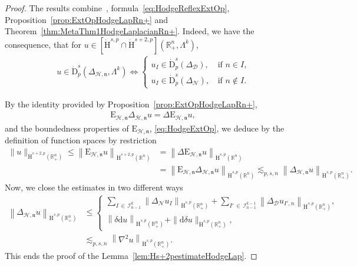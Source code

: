 \documentclass[AHL,Unicode,longabstracts,published]{cedram}
\newcommand{\bbR}{\mathbb{R}}
\newcommand{\rmH}{\mathrm{H}}%
\newcommand{\rmd}{\mathrm{d}}
\newcommand{\rmD}{\mathrm{D}}
\newcommand{\rmE}{\mathrm{E}}
\newcommand{\clH}{\mathcal{H}}
\newcommand{\clI}{\mathcal{I}}
\newcommand{\clN}{\mathcal{N}}
\newcommand{\clD}{\mathcal{D}}
\newcommand{\fkn}{\mathfrak{n}}
\begin{document}
\begin{proof}
The results combine~\cite[Propositions~5.4~\&~5.6]{Gaudin2022}, formula~\eqref{eq:HodgeReflexExtOp}, Proposition~\ref{prop:ExtOpHodgeLapRn+} and Theorem~\ref{thm:MetaThm1HodgeLaplacianRn+}. Indeed, we have the consequence, that for $u\in[\dot{\rmH}^{s,p}\cap\dot{\rmH}^{s+2,p}](\bbR^n_+,\Lambda^k)$,
\begin{align*}
u \in\dot{\rmD}^{s}_{p}\left({{\Delta}}_{\clH,\fkn},\Lambda^k\right) \Leftrightarrow
\begin{cases}
u_{I} \in \dot{\rmD}^{s}_{p}({{\Delta}}_{\clD}), \,& \text{if } n\in I\text{,}\\
u_{I} \in \dot{\rmD}^{s}_{p}({{\Delta}}_{\clN}),\,&\text{if } n\notin I.
\end{cases}
\end{align*}

By the identity provided by Proposition~\ref{prop:ExtOpHodgeLapRn+},
\begin{align*}
\rmE _{\clH,\fkn}{{\Delta}}_{\clH,\fkn}u = \Delta \rmE _{\clH,\fkn}u,
\end{align*}
and the boundedness properties of $\rmE _{\clH,\fkn}$, \eqref{eq:HodgeExtOp}, we deduce by the definition of function spaces by restriction
\begin{align*}
\| u \|_{\dot{\rmH}^{s+2,p}\left(\bbR^n_+\right)}\leqslant \left\| \rmE _{\clH,\fkn} u\right\|_{\dot{\rmH}^{s+2,p}\left(\bbR^n\right)} &= 
\left\| \Delta\rmE _{\clH,\fkn} u \right\|_{\dot{\rmH}^{s,p}\left(\bbR^n\right)}\\
&= \left\| \rmE _{\clH,\fkn}{{\Delta}}_{\clH,\fkn}u \right\|_{\dot{\rmH}^{s,p}\left(\bbR^n\right)} \lesssim_{p,s,n} \left\| {{\Delta}}_{\clH,\fkn}u \right\|_{\dot{\rmH}^{s,p}\left(\bbR^n_+\right)}.
\end{align*}
Now, we close the estimates in two different ways
\begin{align*}
\left\| {{\Delta}}_{\clH,\fkn}u \right\|_{\dot{\rmH}^{s,p}\left(\bbR^n_+\right)} &\leqslant
\begin{cases}
\sum\limits_{I\,\in\,\clI^{k}_{n-1}}
\left\| \Delta_{\clN} u_{I} \right\|_{\dot{\rmH}^{s,p}\left(\bbR^n_+\right)} + \sum\limits_{I'\,\in\,\clI^{k-1}_{n-1}}
\left\| \Delta_{\clD} u_{I',n} \right\|_{\dot{\rmH}^{s,p}\left(\bbR^n_+\right)},\\
\left\| \delta \rmd u \right\|_{\dot{\rmH}^{s,p}\left(\bbR^n_+\right)} + \| \rmd\delta u \|_{\dot{\rmH}^{s,p}\left(\bbR^n_+\right)},
\end{cases}\\
&\lesssim_{p,s,n} \left\| \nabla^2 u \right\|_{\dot{\rmH}^{s,p}\left(\bbR^n_+\right)}.
\end{align*}
This ends the proof of the Lemma~\ref{lem:Hs+2pestimateHodgeLap}.
\end{proof}
\end{document}
